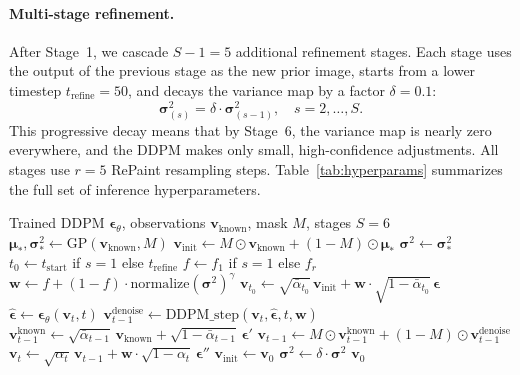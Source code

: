 \documentclass{article}
\begin{document}
\paragraph{Multi-stage refinement.}
After Stage~1, we cascade $S-1 = 5$ additional refinement stages. Each stage uses the output of the previous stage as the new prior image, starts from a lower timestep $t_{\text{refine}} = 50$, and decays the variance map by a factor $\delta = 0.1$:
\begin{equation}
    \boldsymbol{\sigma}^2_{(s)} = \delta \cdot \boldsymbol{\sigma}^2_{(s-1)}, \quad s = 2, \dots, S.
    \label{eq:decay}
\end{equation}
This progressive decay means that by Stage~6, the variance map is nearly zero everywhere, and the DDPM makes only small, high-confidence adjustments. All stages use $r = 5$ RePaint resampling steps. Table~\ref{tab:hyperparams} summarizes the full set of inference hyperparameters.

\begin{algorithm}[t]
\caption{GP-Diff: GP-Guided Multi-Stage Diffusion Inpainting}
\label{alg:gpdiff}
\begin{algorithmic}[1]
\REQUIRE Trained DDPM $\boldsymbol{\epsilon}_\theta$, observations $\mathbf{v}_{\text{known}}$, mask $M$, stages $S=6$
\STATE $\boldsymbol{\mu}_*, \boldsymbol{\sigma}^2_* \gets \text{GP}(\mathbf{v}_{\text{known}}, M)$ 
\STATE $\mathbf{v}_{\text{init}} \gets M \odot \mathbf{v}_{\text{known}} + (1-M) \odot \boldsymbol{\mu}_*$
\STATE $\boldsymbol{\sigma}^2 \gets \boldsymbol{\sigma}^2_*$
    \STATE $t_0 \gets t_{\text{start}}$ if $s=1$ else $t_{\text{refine}}$
    \STATE $f \gets f_1$ if $s=1$ else $f_r$ 
    \STATE $\mathbf{w} \gets f + (1-f) \cdot \text{normalize}(\boldsymbol{\sigma}^2)^\gamma$
    \STATE $\mathbf{v}_{t_0} \gets \sqrt{\bar\alpha_{t_0}}\,\mathbf{v}_{\text{init}} + \mathbf{w} \cdot\sqrt{1-\bar\alpha_{t_0}}\,\boldsymbol{\epsilon}$
         
            \STATE $\hat{\boldsymbol{\epsilon}} \gets \boldsymbol{\epsilon}_\theta(\mathbf{v}_t, t)$
            \STATE $\mathbf{v}_{t-1}^{\text{denoise}} \gets \text{DDPM\_step}(\mathbf{v}_t, \hat{\boldsymbol{\epsilon}}, t, \mathbf{w})$
            \STATE $\mathbf{v}_{t-1}^{\text{known}} \gets \sqrt{\bar\alpha_{t-1}}\,\mathbf{v}_{\text{known}} + \sqrt{1-\bar\alpha_{t-1}}\,\boldsymbol{\epsilon}'$
            \STATE $\mathbf{v}_{t-1} \gets M \odot \mathbf{v}_{t-1}^{\text{known}} + (1-M) \odot \mathbf{v}_{t-1}^{\text{denoise}}$
                \STATE $\mathbf{v}_t \gets \sqrt{\alpha_t}\,\mathbf{v}_{t-1} + \mathbf{w}\cdot\sqrt{1-\alpha_t}\,\boldsymbol{\epsilon}''$ 
            \ENDIF
        \ENDFOR
    \ENDFOR
    \STATE $\mathbf{v}_{\text{init}} \gets \mathbf{v}_0$ 
    \STATE $\boldsymbol{\sigma}^2 \gets \delta \cdot \boldsymbol{\sigma}^2$ 
\ENDFOR
\RETURN $\mathbf{v}_0$
\end{algorithmic}
\end{algorithm}
\end{document}
